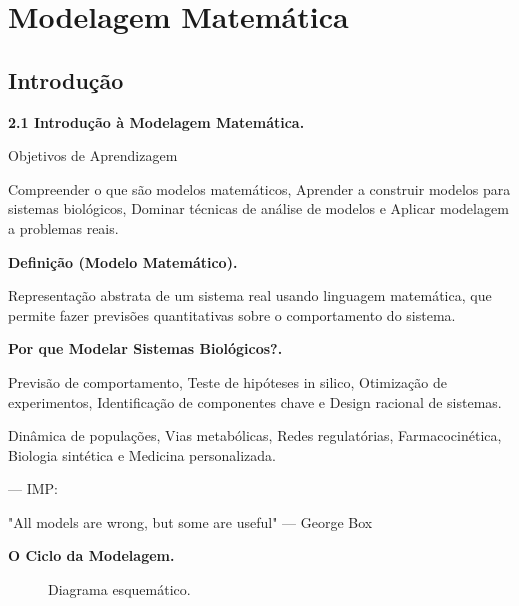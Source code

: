 \chapter{Modelagem Matemática}
\label{cap:02}


\section{Introdução}

\textbf{2.1 Introdução à Modelagem Matemática.}

Objetivos de Aprendizagem

Compreender o que são modelos matemáticos, Aprender a construir modelos para sistemas biológicos, Dominar técnicas de análise de modelos e Aplicar modelagem a problemas reais.

\textbf{Definição (Modelo Matemático).}

Representação abstrata de um sistema real usando linguagem matemática, que permite fazer previsões quantitativas sobre o comportamento do sistema.

\textbf{Por que Modelar Sistemas Biológicos?.}

Previsão de comportamento, Teste de hipóteses in silico, Otimização de experimentos, Identificação de componentes chave e Design racional de sistemas.

Dinâmica de populações, Vias metabólicas, Redes regulatórias, Farmacocinética, Biologia sintética e Medicina personalizada.

--- IMP: 

"All models are wrong, but some are useful" --- George Box

\textbf{O Ciclo da Modelagem.}

%
\begin{figure}[htbp]
\centering
{}
\caption{Diagrama esquemático.}
\end{figure}
%

